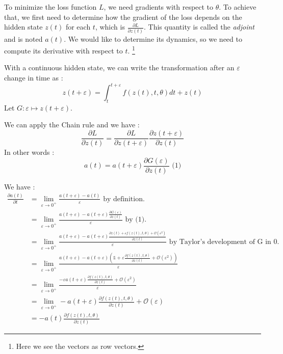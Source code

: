 \documentclass[10pt,a4paper]{article}
\theoremstyle{definition}
\theoremstyle{definition}
\theoremstyle{definition}
\begin{document}
To minimize the loss function $L$, we need gradients with respect to $\theta$. To achieve that, we first need to determine how the gradient of the loss depends on the hidden state $z(t)$ for each $t$, which is $\frac{\partial L}{\partial z(t)}$. This quantity is called the \textit{adjoint} and is noted $a(t)$. We would like to determine its dynamics, so we need to compute its derivative with respect to $t$. \footnote{Here we see the vectors as row vectors.}

With a continuous hidden state, we can write the transformation after an $\varepsilon$ change in time as :
$$
z(t+\varepsilon) = \int^{t+\varepsilon}_{t} f(z(t),t,\theta) dt + z(t)
$$
Let $ G : \varepsilon \mapsto z(t+\varepsilon)$.

We can apply the Chain rule and we have :
$$
\frac{\partial L}{\partial z(t)} = \frac{\partial L}{\partial z(t+\varepsilon)} \frac{\partial z(t+\varepsilon)}{\partial z(t)}
$$
In other words :
$$
a(t) = a(t+\varepsilon)\frac{\partial G(\varepsilon)}{\partial z(t)} \text{   (1)}
$$

We have :
\begin{align*}
\frac{\partial a(t)}{\partial t} &= \lim_{\varepsilon \rightarrow 0^+} \frac{a(t+\varepsilon) - a(t)}{\varepsilon} \text{ by definition.}\\
&= \lim_{\varepsilon \rightarrow 0^+} \frac{a(t+\varepsilon) - a(t+\varepsilon)\frac{\partial G(\varepsilon)}{\partial z(t)}}{\varepsilon} \text{ by (1).}\\
&= \lim_{\varepsilon \rightarrow 0^+} \frac{a(t+\varepsilon) - a(t+\varepsilon)\frac{\partial z(t) + \varepsilon f(z(t),t,\theta) + \mathcal{O}(\varepsilon^2)}{\partial z(t)}}{\varepsilon} \text{ by Taylor's development of G in 0.} \\
&= \lim_{\varepsilon \rightarrow 0^+} \frac{a(t+\varepsilon) - a(t+\varepsilon)(\mathbb{1} + \varepsilon \frac{\partial f(z(t),t,\theta)} {\partial z(t)}+ \mathcal{O}(\varepsilon^2))}{\varepsilon}\\
&= \lim_{\varepsilon \rightarrow 0^+} \frac{-\varepsilon a(t+\varepsilon) \frac{\partial f(z(t),t,\theta)} {\partial z(t)}+ \mathcal{O}(\varepsilon^2)}{\varepsilon}\\
&= \lim_{\varepsilon \rightarrow 0^+} - a(t+\varepsilon) \frac{\partial f(z(t),t,\theta)} {\partial z(t)}+ \mathcal{O}(\varepsilon)\\
&= -a(t)\frac{\partial f(z(t),t,\theta)} {\partial z(t)}
\end{align*}
 
\end{document}
